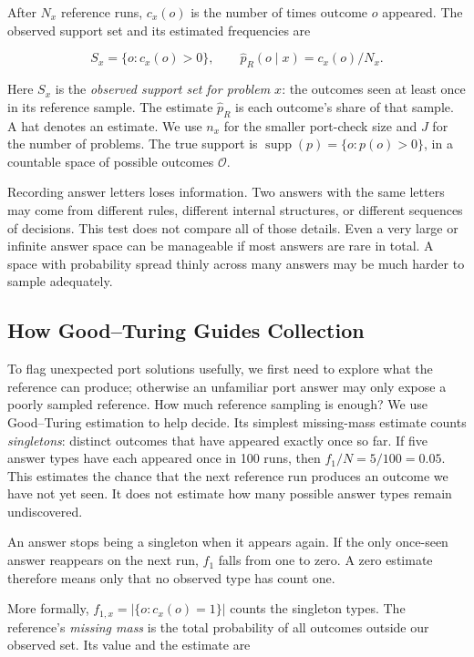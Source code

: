 \documentclass[10pt,letterpaper]{article}
\begin{document}
After \(N_x\) reference runs, \(c_x(o)\) is the number of times outcome \(o\) appeared.
The observed support set and its estimated frequencies are

\[
S_x=\{o:c_x(o)>0\},\qquad \widehat p_R(o\mid x)=c_x(o)/N_x.
\]

Here \(S_x\) is the \emph{observed support set for problem \(x\)}: the outcomes seen at
least once in its reference sample. The estimate \(\widehat p_R\) is each outcome's share
of that sample. A hat denotes an estimate. We use \(n_x\) for the smaller port-check size
and \(J\) for the number of problems. The true support is
\(\operatorname{supp}(p)=\{o:p(o)>0\}\), in a countable space of possible outcomes
\(\mathcal O\).

Recording answer letters loses information. Two answers with the same letters may come
from different rules, different internal structures, or different sequences of decisions.
This test does not compare all of those details. Even a very large or infinite answer
space can be manageable if most answers are rare in total. A space with probability spread
thinly across many answers may be much harder to sample adequately.

\subsection{How Good--Turing Guides Collection}\label{sec:stopping}

To flag unexpected port solutions usefully, we first need to explore what the reference
can produce; otherwise an unfamiliar port answer may only expose a poorly sampled
reference. How much reference sampling is enough? We use Good--Turing estimation
\citep{ref8} to help decide. Its simplest missing-mass estimate counts \emph{singletons}:
distinct outcomes that have appeared exactly once so far. If five answer types have each
appeared once in 100 runs, then \(f_1/N=5/100=0.05\). This estimates the chance that the
next reference run produces an outcome we have not yet seen. It does not estimate how many
possible answer types remain undiscovered.

An answer stops being a singleton when it appears again. If the only once-seen answer
reappears on the next run, \(f_1\) falls from one to zero. A zero estimate therefore means
only that no observed type has count one.

More formally, \(f_{1,x}=|\{o:c_x(o)=1\}|\) counts the singleton types. The reference's
\emph{missing mass} is the total probability of all outcomes outside our observed set. Its
value and the estimate are
\end{document}

